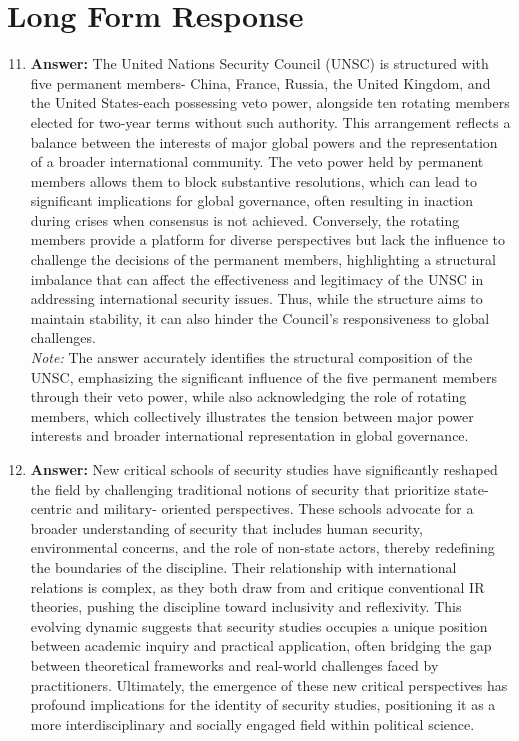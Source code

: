\documentclass[12pt]{article}
\begin{document}
\section*{Long Form Response}
\begin{enumerate}[label=\arabic*.]
\setcounter{enumi}{10}
\item \textbf{Answer:} The United Nations Security Council (UNSC) is structured with five permanent members- China, France, Russia, the United Kingdom, and the United States-each possessing veto power, alongside ten rotating members elected for two-year terms without such authority. This arrangement reflects a balance between the interests of major global powers and the representation of a broader international community. The veto power held by permanent members allows them to block substantive resolutions, which can lead to significant implications for global governance, often resulting in inaction during crises when consensus is not achieved. Conversely, the rotating members provide a platform for diverse perspectives but lack the influence to challenge the decisions of the permanent members, highlighting a structural imbalance that can affect the effectiveness and legitimacy of the UNSC in addressing international security issues. Thus, while the structure aims to maintain stability, it can also hinder the Council's responsiveness to global challenges.
\\ \textit{Note:} The answer accurately identifies the structural composition of the UNSC, emphasizing the significant influence of the five permanent members through their veto power, while also acknowledging the role of rotating members, which collectively illustrates the tension between major power interests and broader international representation in global governance.
\item \textbf{Answer:} New critical schools of security studies have significantly reshaped the field by challenging traditional notions of security that prioritize state-centric and military- oriented perspectives. These schools advocate for a broader understanding of security that includes human security, environmental concerns, and the role of non-state actors, thereby redefining the boundaries of the discipline. Their relationship with international relations is complex, as they both draw from and critique conventional IR theories, pushing the discipline toward inclusivity and reflexivity. This evolving dynamic suggests that security studies occupies a unique position between academic inquiry and practical application, often bridging the gap between theoretical frameworks and real-world challenges faced by practitioners. Ultimately, the emergence of these new critical perspectives has profound implications for the identity of security studies, positioning it as a more interdisciplinary and socially engaged field within political science.

\end{enumerate}
\end{document}
